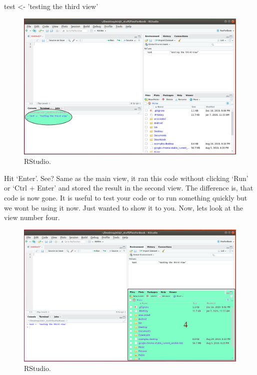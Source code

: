 \documentclass[]{book}
\newenvironment{Shaded}{\begin{snugshade}}{\end{snugshade}}
\newcommand{\NormalTok}[1]{#1}
\newcommand{\StringTok}[1]{\textcolor[rgb]{0.31,0.60,0.02}{#1}}
\begin{document}
\begin{Shaded}
\begin{Highlighting}[]
\NormalTok{  test <-}\StringTok{ 'testing the third view'}
\end{Highlighting}
\end{Shaded}

\begin{figure}
\centering
\includegraphics{rstudio5.png}
\caption{RStudio.}
\end{figure}

Hit `Enter'. See? Same as the main view, it ran this code without clicking `Run' or `Ctrl + Enter' and stored the result in the second view. The difference is, that code is now gone. It is useful to test your code or to run something quickly but we wont be using it now. Just wanted to show it to you. Now, lets look at the view number four.

\begin{figure}
\centering
\includegraphics{rstudio6.png}
\caption{RStudio.}
\end{figure}
\end{document}
